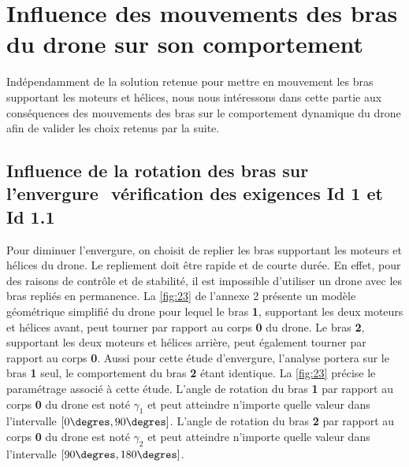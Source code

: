 \section{\label{sec:01} Influence des mouvements des bras du drone sur son comportement}

Indépendamment de la solution retenue pour mettre en mouvement les bras supportant les
moteurs et hélices, nous nous intéressons dans cette partie aux conséquences des mouvements des bras sur le comportement dynamique du drone afin de valider les choix retenus
par la suite.

\subsection{Influence de la rotation des bras sur l’envergure ­ vérification des exigences Id 1
et Id 1.1}

Pour diminuer l’envergure, on choisit de replier les bras supportant les moteurs et hélices du
drone. Le repliement doit être rapide et de courte durée. En effet, pour des raisons de contrôle
et de stabilité, il est impossible d’utiliser un drone avec les bras repliés en permanence. La
\autoref{fig:23} de l’annexe 2 présente un modèle géométrique simplifié du drone pour lequel le
bras \textbf{1}, supportant les deux moteurs et hélices avant, peut tourner par rapport au corps \textbf{0} du
drone. Le bras \textbf{2}, supportant les deux moteurs et hélices arrière, peut également tourner par
rapport au corps \textbf{0}. Aussi pour cette étude d’envergure, l’analyse portera sur le bras \textbf{1} seul,
le comportement du bras \textbf{2} étant identique. La \autoref{fig:23} précise le paramétrage associé à
cette étude. L’angle de rotation du bras \textbf{1} par rapport au corps \textbf{0} du drone est noté $\gamma_1$ et peut
atteindre n’importe quelle valeur dans l’intervalle $[0\degres, 90\degres]$.
L’angle de rotation du bras \textbf{2} par rapport au corps \textbf{0} du drone est noté $\gamma_2$ et peut atteindre
n’importe quelle valeur dans l’intervalle $[90\degres, 180\degres]$.

\ifprof
\begin{corrige}
\end{corrige}
\else
\fi

\ifprof
\begin{corrige}
\end{corrige}
\else
\fi


